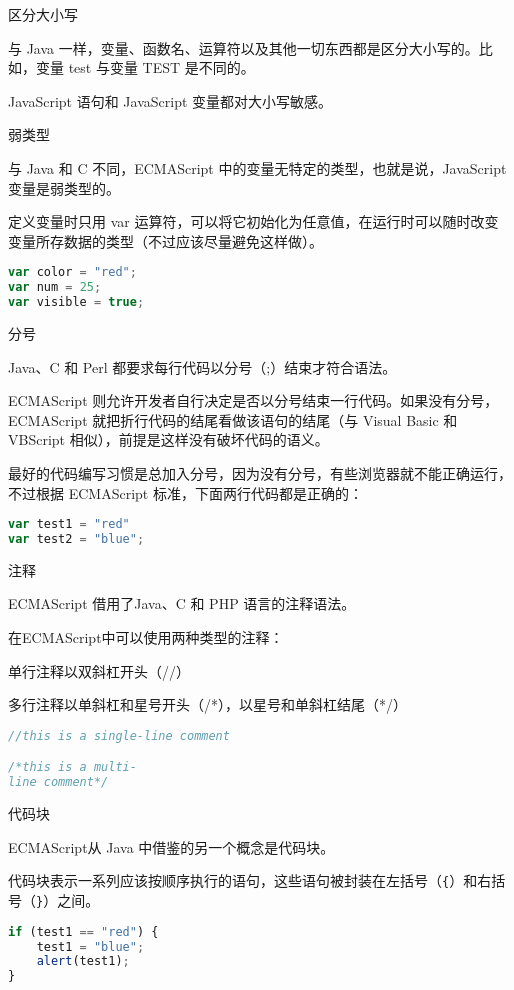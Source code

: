 \begin{compactenum}
\item 区分大小写

与 Java 一样，变量、函数名、运算符以及其他一切东西都是区分大小写的。比如，变量 test 与变量 TEST 是不同的。

JavaScript 语句和 JavaScript 变量都对大小写敏感。


\item 弱类型

与 Java 和 C 不同，ECMAScript 中的变量无特定的类型，也就是说，JavaScript变量是弱类型的。

定义变量时只用 var 运算符，可以将它初始化为任意值，在运行时可以随时改变变量所存数据的类型（不过应该尽量避免这样做）。

\begin{lstlisting}[language=JavaScript]
var color = "red";
var num = 25;
var visible = true;
\end{lstlisting}


\item 分号

Java、C 和 Perl 都要求每行代码以分号（;）结束才符合语法。

ECMAScript 则允许开发者自行决定是否以分号结束一行代码。如果没有分号，ECMAScript 就把折行代码的结尾看做该语句的结尾（与 Visual Basic 和 VBScript 相似），前提是这样没有破坏代码的语义。

最好的代码编写习惯是总加入分号，因为没有分号，有些浏览器就不能正确运行，不过根据 ECMAScript 标准，下面两行代码都是正确的：

\begin{lstlisting}[language=JavaScript]
var test1 = "red"
var test2 = "blue";
\end{lstlisting}

\item 注释

ECMAScript 借用了Java、C 和 PHP 语言的注释语法。

在ECMAScript中可以使用两种类型的注释：

\begin{compactitem}
\item 单行注释以双斜杠开头（//）
\item 多行注释以单斜杠和星号开头（/*），以星号和单斜杠结尾（*/）
\end{compactitem}

\begin{lstlisting}[language=JavaScript]
//this is a single-line comment

/*this is a multi-
line comment*/
\end{lstlisting}


\item 代码块

ECMAScript从 Java 中借鉴的另一个概念是代码块。

代码块表示一系列应该按顺序执行的语句，这些语句被封装在左括号（\texttt{\{}）和右括号（\texttt{\}}）之间。

\begin{lstlisting}[language=JavaScript]
if (test1 == "red") {
    test1 = "blue";
    alert(test1);
}
\end{lstlisting}

\end{compactenum}
